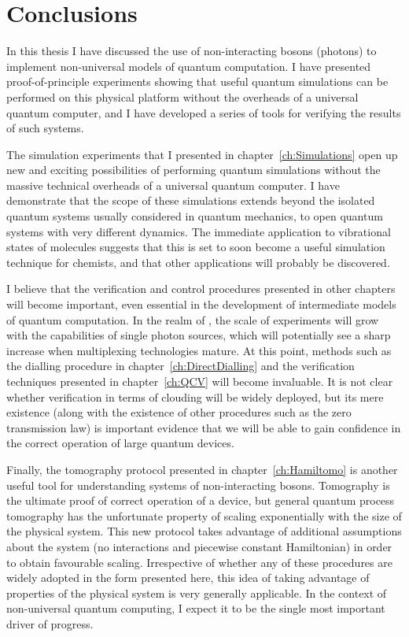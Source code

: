 \chapter{Conclusions}
\label{ch:Conclusions}
In this thesis I have discussed the use of non-interacting bosons (photons) to
implement non-universal models of quantum computation. I have presented
proof-of-principle experiments showing that useful quantum simulations can be
performed on this physical platform without the overheads of a universal quantum
computer, and I have developed a series of tools for verifying the results of
such systems.

The simulation experiments that I presented in chapter~\ref{ch:Simulations} open
up new and exciting possibilities of performing quantum simulations without the
massive technical overheads of a universal quantum computer. I have demonstrate
that the scope of these simulations extends beyond the isolated quantum systems
usually considered in quantum mechanics, to open quantum systems with very
different dynamics. The immediate application to vibrational states of molecules
suggests that this is set to soon become a useful simulation technique for
chemists, and that other applications will probably be discovered.

I believe that the verification and control procedures presented in other
chapters will become important, even essential in the development of
intermediate models of quantum computation. In the realm of \bosonsampling{},
the scale of experiments will grow with the capabilities of single photon
sources, which will potentially see a sharp increase when multiplexing
technologies mature. At this point, methods such as the dialling procedure in
chapter~\ref{ch:DirectDialling} and the verification techniques presented in
chapter~\ref{ch:QCV} will become invaluable. It is not clear whether
verification in terms of clouding will be widely deployed, but its mere
existence (along with the existence of other procedures such as the zero
transmission law) is important evidence that we will be able to gain confidence
in the correct operation of large quantum devices. 

Finally, the tomography protocol presented in chapter~\ref{ch:Hamiltomo} is
another useful tool for understanding systems of non-interacting bosons.
Tomography is the ultimate proof of correct operation of a device, but general
quantum process tomography has the unfortunate property of scaling exponentially
with the size of the physical system. This new protocol takes advantage of
additional assumptions about the system (no interactions and piecewise constant
Hamiltonian) in order to obtain favourable scaling. Irrespective of whether any
of these procedures are widely adopted in the form presented here, this idea of
taking advantage of properties of the physical system is very generally
applicable. In the context of non-universal quantum computing, I expect it to be
the single most important driver of progress.

